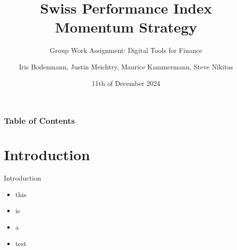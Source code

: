 \documentclass{beamer}
\title{Swiss Performance Index Momentum Strategy}
\subtitle{Group Work Assignment: Digital Tools for Finance}
\author{Iris Bodenmann, Justin Meichtry, Maurice Kammermann, Steve Nikitas}
\date{11th of December 2024}
\institute[]{Igor Pozdeev\\Department of Finance\\ University of Zurich}
\begin{document}
\begin{frame}
\maketitle
\end{frame}

\begin{frame}
\frametitle{Table of Contents}
\tableofcontents
\end{frame}

\section{Introduction}
\begin{frame}{Introduction}
\begin{itemize}
    \item this
    \item is
    \item a
    \item test
\end{itemize}
\end{frame}
\end{document}
